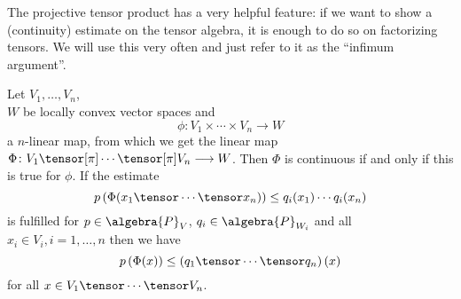 The projective tensor product has a very helpful feature: if we want to show a 
(continuity) estimate on the tensor algebra, it is enough to do so on 
factorizing tensors. We will use this very often and just refer to it as the 
``infimum argument''.
\begin{lemma}
	\label{LCAna:Lemma:InfimumArgument}
 	Let $V_1, \ldots, V_n$, \hfill  \\
 	$W$ be locally convex vector spaces and 
	\begin{equation*}
		\phi \colon
		V_1 \times \cdots \times V_n
		\longrightarrow
		W
	\end{equation*}
	a $n$-linear map, from which we get the linear map 
	$\Phi \colon V_1 \tensor[\pi] \cdots \tensor[\pi] V_n \longrightarrow W$.
	Then $\Phi$ is continuous if and only if this is true for $\phi$. 
	If the estimate
	\begin{equation}
		\label{LCAna:ContOnFactors}
		p \left(
			\Phi (x_1 \tensor \cdots \tensor x_n)
		\right)
		\leq
		q_i(x_1) \cdots q_i(x_n)
	\end{equation}
	is fulfilled for $p\in\algebra{P}_V$, $q_i \in \algebra{P}_{W_i}$ 
	and all $x_i \in V_i, i=1, \ldots, n$ then we have
	\begin{equation}
		\label{LCAna:ContGeneral}
		p \left(
			\Phi (x)
		\right)
		\leq
		\left( q_1 \tensor \cdots \tensor q_n \right)(x)
	\end{equation}
	for all $x \in V_1 \tensor \cdots \tensor V_n$.
\end{lemma}
